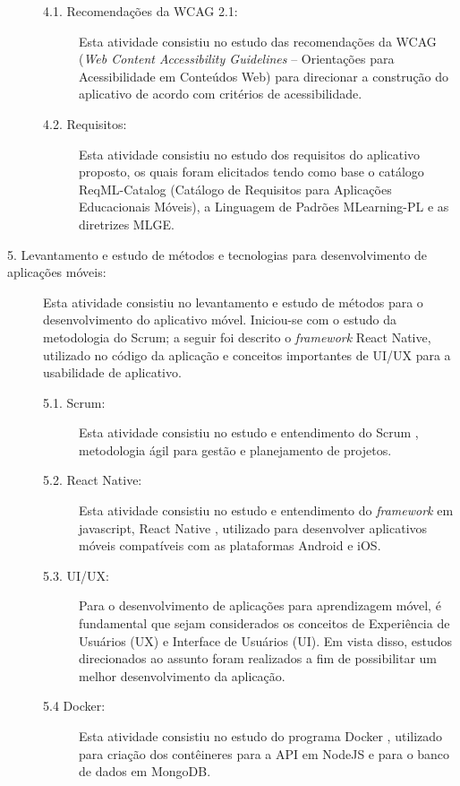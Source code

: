 \begin{description}
\begin{description}
    \item[4.1. Recomendações da WCAG 2.1:]
    Esta atividade consistiu no estudo das recomendações da WCAG (\textit{Web Content Accessibility Guidelines} -- Orientações para Acessibilidade em Conteúdos Web) para direcionar a construção do aplicativo de acordo com critérios de acessibilidade.
    
    \item[4.2. Requisitos:]
    Esta atividade consistiu no estudo dos requisitos do aplicativo proposto, os quais foram elicitados tendo como base o catálogo ReqML-Catalog (Catálogo de Requisitos para Aplicações Educacionais Móveis), a Linguagem de Padrões MLearning-PL e as diretrizes MLGE.
\end{description}


\item[5. Levantamento e estudo de métodos e tecnologias para desenvolvimento de aplicações móveis:]
Esta atividade consistiu no levantamento e estudo de métodos para o desenvolvimento do aplicativo móvel. Iniciou-se com o estudo da metodologia do Scrum; a seguir foi descrito o \textit{framework} React Native, utilizado no código da aplicação e conceitos importantes de UI/UX para a usabilidade de aplicativo. 

\begin{description}
\item[5.1. Scrum:] Esta atividade consistiu no estudo e entendimento do Scrum \citep{scrumSite}, metodologia ágil para gestão e planejamento de projetos. %

\item[5.2. React Native:] Esta atividade consistiu no estudo e entendimento do \textit{framework} em javascript, React Native \citep{RN}, utilizado para desenvolver aplicativos móveis compatíveis com as plataformas Android e iOS.

\item[5.3. UI/UX:] Para o desenvolvimento de aplicações para aprendizagem móvel, é fundamental que sejam considerados os conceitos de Experiência de Usuários (UX) e Interface de Usuários (UI). Em vista disso, estudos direcionados ao assunto foram realizados a fim de possibilitar um melhor desenvolvimento da aplicação.

\item[5.4 Docker:] Esta atividade consistiu no estudo do programa Docker \citep{docker}, utilizado para criação dos contêineres para a API em NodeJS e para o banco de dados em MongoDB.


\end{description}
\end{description}
